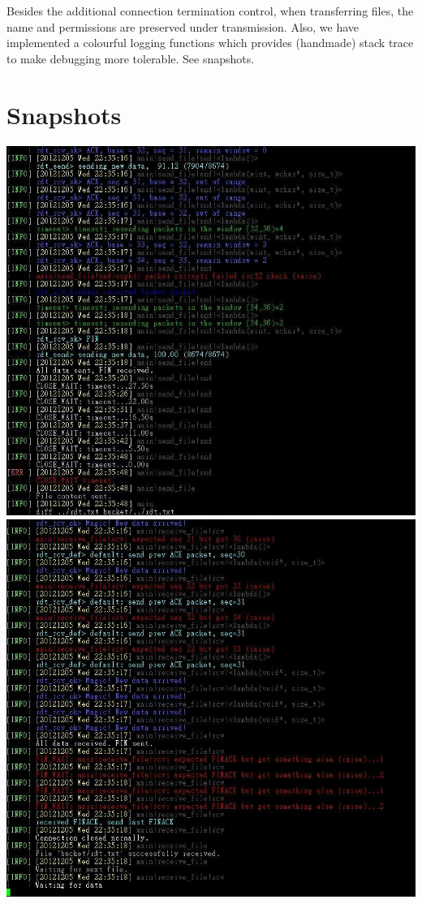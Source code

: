 \documentclass[10pt,a4paper]{article}
\begin{document}
    Besides the additional connection termination control, when transferring files, the name and permissions are preserved under transmission. Also, we have implemented a colourful logging functions which provides (handmade) stack trace to make debugging more tolerable. See snapshots. 
\section{Snapshots}
\begin{center}
\includegraphics[scale=0.8]{shotsnd.jpg}\\
\includegraphics[scale=0.75]{shotrcv.jpg}\\

\end{center}
\end{document}
